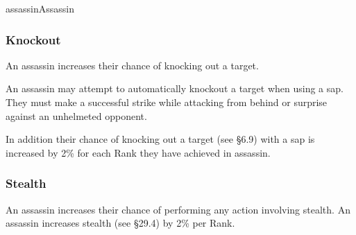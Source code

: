 \begin{Skill}{assassin}{Assassin}
\subsubsection{Knockout}

An assassin increases their chance of knocking out a target.

An assassin may attempt to automatically knockout a target when using
a sap.  They must make a successful strike while attacking from behind
or surprise against an unhelmeted opponent.

In addition their chance of knocking out a target (see §6.9) with a
sap is increased by 2\% for each Rank they have achieved in assassin.

\subsubsection{Stealth}

An assassin increases their chance of performing any action involving
stealth.  An assassin increases stealth (see §29.4) by 2\% per Rank.

\end{Skill}
